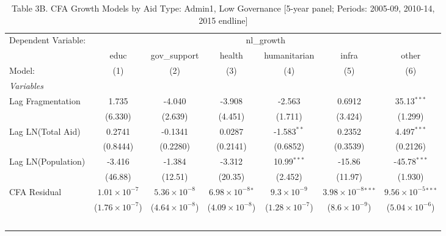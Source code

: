 
\begin{table}[H]
   \caption{Table 3B. CFA Growth Models by Aid Type: Admin1, Low Governance [5-year panel; Periods: 2005-09, 2010-14, 2015 endline]}
   \centering
   \begin{tabular}{lcccccc}
      \tabularnewline \midrule \midrule
      Dependent Variable: & \multicolumn{6}{c}{nl\_growth}\\
                         & educ                    & gov\_support            & health                      & humanitarian            & infra                         & other \\   
      Model:             & (1)                     & (2)                     & (3)                         & (4)                     & (5)                           & (6)\\  
      \midrule
      \emph{Variables}\\
      Lag Fragmentation  & 1.735                   & -4.040                  & -3.908                      & -2.563                  & 0.6912                        & 35.13$^{***}$\\   
                         & (6.330)                 & (2.639)                 & (4.451)                     & (1.711)                 & (3.424)                       & (1.299)\\   
      Lag LN(Total Aid)  & 0.2741                  & -0.1341                 & 0.0287                      & -1.583$^{**}$           & 0.2352                        & 4.497$^{***}$\\   
                         & (0.8444)                & (0.2280)                & (0.2141)                    & (0.6852)                & (0.3539)                      & (0.2126)\\   
      Lag LN(Population) & -3.416                  & -1.384                  & -3.312                      & 10.99$^{***}$           & -15.86                        & -45.78$^{***}$\\   
                         & (46.88)                 & (12.51)                 & (20.35)                     & (2.452)                 & (11.97)                       & (1.930)\\   
      CFA Residual       & $1.01\times 10^{-7}$    & $5.36\times 10^{-8}$    & $6.98\times 10^{-8}$$^{*}$  & $9.3\times 10^{-9}$     & $3.98\times 10^{-8}$$^{***}$  & $9.56\times 10^{-5}$$^{***}$\\    
                         & ($1.76\times 10^{-7}$)  & ($4.64\times 10^{-8}$)  & ($4.09\times 10^{-8}$)      & ($1.28\times 10^{-7}$)  & ($8.6\times 10^{-9}$)         & ($5.04\times 10^{-6}$)\\    
$$
\end{tabular}
\end{table}
